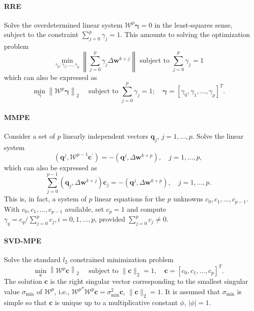 \paragraph{RRE}

Solve the overdetermined linear system \(\mathscr W^{p} \boldsymbol\gamma=0\) in the least-squares sense, subject to the constraint \(\sum_{j=0}^{p} \gamma_{j}=1\).
This amounts to solving the optimization problem
\begin{equation}
\min _{\gamma_{0}, \gamma_{1}, \ldots, \gamma_{p}}\left\|\sum_{j=0}^{p} \gamma_{j} \Delta\mathbf w^{k+j}\right\| \text { subject to } \sum_{j=0}^{p} \gamma_{j}=1
\end{equation}
which can also be expressed as
\begin{equation}
\min _{\boldsymbol\gamma}\left\|\mathscr W^{p} \boldsymbol\gamma\right\|_2 \quad \text { subject to } \sum_{j=0}^{p} \gamma_{j}=1 ; \quad \boldsymbol\gamma=\left[\gamma_{0}, \gamma_{1}, \ldots, \gamma_{p}\right]^{T} .
\end{equation}

\paragraph{MMPE}

Consider a set of \(p\) linearly independent vectors \(\mathbf q_j\), \(j=1, \dots, p\).
Solve the linear system
\begin{equation}
  \left(\mathbf q^{j}, \mathscr W^{p-1} \mathbf c^{\prime}\right)=-\left(\mathbf q^{j}, \Delta \mathbf w^{k+p}\right), \quad j=1, \ldots, p,
\end{equation}
which can also be expressed as
\begin{equation}
  \sum_{j=0}^{p-1}\left(\mathbf q_{j}, \Delta \mathbf w^{k+j}\right) \mathbf c_{j}=-\left(\mathbf q^{j}, \Delta \mathbf w^{k+p}\right), \quad j=1, \ldots, p.
\end{equation}
This is, in fact, a system of \(p\) linear equations for the \(p\) unknowns \(c_{0}, c_{1}, \ldots, c_{p-1}\).
With \(c_{0}, c_{1}, \ldots, c_{p-1}\) available, set \(c_{p}=1\) and compute \(\gamma_{q}=c_{q} / \sum_{j=0}^{p} c_{j}, i=0,1, \ldots, p\), provided \(\sum_{j=0}^{p} c_{j} \neq 0\).

\paragraph{SVD-MPE}

Solve the standard \(l_{2}\) constrained minimization problem
\begin{equation}
  \min_{\mathbf c}\left\|\mathscr W^{p} \mathbf c\right\|_{2} \quad \text { subject to }\|\mathbf c\|_{2}=1, \quad \mathbf c=\left[c_{0}, c_{1}, \ldots, c_{p}\right]^{T} .
\end{equation}
The solution \(\mathbf c\) is the right singular vector corresponding to the smallest singular value \(\sigma_{\min }\) of \(\mathscr W^{p}\), i.e., \({\mathscr W^{p}}^{*} \mathscr W^{p} \mathbf c=\sigma_{\min }^{2} \mathbf c\), \(\|\mathbf c\|_{2}=1\).
It is assumed that \(\sigma_{\min }\) is simple so that \(\mathbf c\) is unique up to a multiplicative constant \(\phi\), \(|\phi|=1\).

